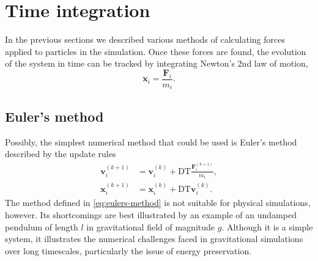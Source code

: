 \section{Time integration}
In the previous sections we described various methods of calculating forces applied to particles in the simulation.
Once these forces are found, the evolution of the system in time can be tracked by integrating Newton's 2nd law of motion,
\begin{equation}\label{eq:newtons-second}
    \ddot{\mathbf{x}}_i = \frac{\mathbf{F}_i}{m_i}.
\end{equation}

\subsection{Euler's method}
Possibly, the simplest numerical method that could be used is Euler's method described by the update rules
\begin{equation}\label{eq:eulers-method}
    \begin{aligned}
        \mathbf{v}_i^{(k+1)} & = \mathbf{v}_i^{(k)} + \textrm{DT} \frac{\mathbf{F}^{(k+1)}_i}{m_i}, \\
        \mathbf{x}_i^{(k+1)} & = \mathbf{x}_i^{(k)} + \textrm{DT} \mathbf{v}_i^{(k)}.
    \end{aligned}
\end{equation}
The method defined in \autoref{eq:eulers-method} is not suitable for physical simulations, however.
Its shortcomings are best illustrated by an example of an undamped pendulum of length $l$ in gravitational field of magnitude $g$.
Although it is a simple system, it illustrates the numerical challenges faced in gravitational simulations over long timescales, particularly the issue of energy preservation.

